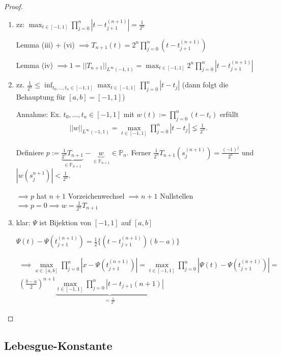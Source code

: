 \begin{proof}
	\begin{enumerate}
		\item zz: $\max_{t \in [-1, 1]} \prod_{j=0}^{n} |t-t_{j+1}^{(n+1)}| = \frac{1}{2^n}$
		
		Lemma (iii) + (vi) $\implies T_{n+1}(t) = 2^n \prod_{j=0}^{n} (t-t_{j+1}^{(n+1)})$
		
		Lemma (iv) $\implies 1 = ||T_{n+1}||_{L^\infty(-1, 1)} = \max_{t \in [-1, 1]} 2^n \prod_{j=0}^{n} |t-t_{j+1}^{(n+1)}|$
		
		\item zz. $\frac{1}{2^n} \leq \inf_{t_0, ..., t_n \in [-1, 1]} \max_{t \in [-1, 1]} \prod_{j=0}^{n} |t-t_j|$ (dann folgt die Behauptung für $[a, b] = [-1, 1]$)
		
		Annahme: Ex. $t_0, ..., t_n \in [-1, 1]$ mit $w(t) := \prod_{j=0}^{n} (t-t_i)$ erfüllt
		\begin{align*}
			||w||_{L^\infty(-1, 1)} = \max_{t \in [-1, 1]} \prod_{j=0}^{n} |t-t_j| \lneq \frac{1}{2^n}.
		\end{align*}
		
		Definiere $p := \underbrace{\frac{1}{2^n} T_{n+1}}_{\in \mathbb{P}_{n+1}} - \underbrace{w}_{\in \mathbb{P}_{n+1}} \in \mathbb{P}_n$. Ferner $\frac{1}{2^n}T_{n+1}(s_j^{(n+1)}) = \frac{(-1)^j}{2^n}$ und $|w(s_j^{n+1})| < \frac{1}{2^n}$.
		
		$\implies p$ hat $n+1$ Vorzeichenwechsel $\implies n+1$ Nullstellen $\implies p=0 \implies w = \frac{1}{2^n} T_{n+1}$ \lightning
		
		\item klar: $\Psi$ ist Bijektion von $[-1, 1]$ auf $[a, b]$
		
		$\Psi(t) - \Psi(t_{j+1}^{(n+1)}) = \frac{1}{2} \{(t - t_{j+1}^{(n+1)})(b-a)\}$
		
		\begin{align*}
			\implies \max_{x\in [a,b]} \prod_{j=0}^{n} |x-\Psi(t_{j+1}^{(n+1)})| = \max_{t \in [-1, 1]} \prod_{j=0}^{n} |\Psi(t) - \Psi(t_{j+1}^{(n+1)})| =\\
			\left(\frac{b-a}{2}\right)^{n+1} \underbrace{\max_{t \in [-1, 1]} \prod_{j=0}^{n} |t-t_{j+1}	{(n+1)}|}_{=\frac{1}{2^n}}
		\end{align*}
	\end{enumerate}
\end{proof}

\subsection{Lebesgue-Konstante}

